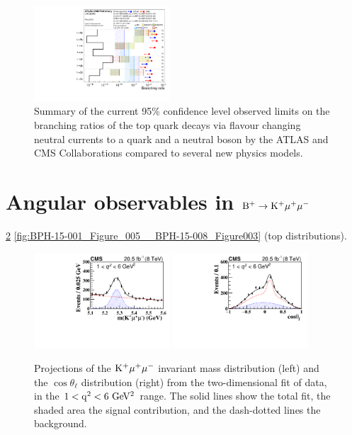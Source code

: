 \documentclass{PoS}
\begin{document}
\begin{figure}[htb]
\centering
\includegraphics[width=0.45\textwidth]{figures/fcnc_summarybsm_may18}
\caption{
  Summary of the current 95\% confidence level observed limits on the branching
  ratios of the top quark decays via flavour changing neutral currents to a
  quark and a neutral boson by the ATLAS and CMS Collaborations compared to
  several new physics models. 
}
\label{fig:fcnc_summarybsm_may18}
\end{figure}


\section{Angular observables in ${\rm B^+ \to K^+\mu^+\mu^-}$}

\cite{bph-15-001}
\ref{fig:BPH-15-001_Figures_003-004}
\ref{fig:BPH-15-001_Figure_005__BPH-15-008_Figure003} (top distributions).


\begin{figure}[htb]
\centering
\includegraphics[width=0.45\textwidth]{figures/CMS-BPH-15-001_Figure_003-h}
\includegraphics[width=0.45\textwidth]{figures/CMS-BPH-15-001_Figure_004-h}
\caption{
  Projections of the ${\rm K^+\mu^+\mu^-}$ invariant mass distribution (left) and the
  $\cos\theta_\ell$ distribution (right) from the two-dimensional fit of data, in
  the ${\rm 1 < q^2 < 6~GeV^2}$ range. The solid lines show the total fit, the
  shaded area the signal contribution, and the dash-dotted lines the background.
}
\label{fig:BPH-15-001_Figures_003-004}
\end{figure}
\end{document}
